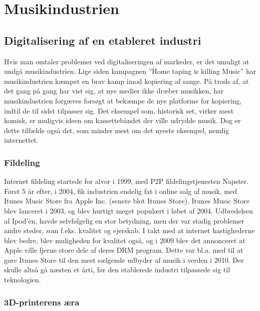 \chapter{Musikindustrien}

\section{Digitalisering af en etableret industri}

Hvis man omtaler problemer ved digitaliseringen af markeder, er det umuligt at undgå musikindustrien. Lige siden kampagnen ”Home taping is killing Music”\cite{Musik1} har musikindustrien kæmpet en brav kamp imod kopiering af sange. På trods af, at det gang på gang har vist sig, at nye medier ikke dræber musikken, har musikindustrien forgæves forsøgt at bekæmpe de nye platforme for kopiering, indtil de til sidst tilpasser sig. Det eksempel som, historisk set, virker mest komisk, er muligvis ideen om kassettebåndet der ville udrydde musik. Dog er dette tilfælde også det, som minder mest om det nyeste eksempel, nemlig internettet.

\subsection{Fildeling}

Internet fildeling startede for alvor i 1999, med P2P\cite{musik2} fildelingstjenesten Napster. Først 5 år efter, i 2004, fik industrien endelig fat i online salg af musik, med Itunes Music Store fra Apple Inc. (senere blot Itunes Store). Itunes Music Store blev lanceret i 2003, og blev hurtigt meget populært i løbet af 2004. Udbredelsen af Ipod’en, havde selvfølgelig en stor betydning, men der var stadig problemer andre steder, som f.eks. kvalitet og ejerskab. I takt med at internet hastighederne blev bedre, blev muligheden for kvalitet også, og i 2009 blev det annonceret at Apple ville fjerne store dele af deres DRM\cite{musik3} program. Dette var bl.a. med til at gøre Itunes Store til den mest sælgende udbyder af musik i verden i 2010.\cite{musik4} Der skulle altså gå næsten et årti, før den etablerede industri tilpassede sig til teknologien. 

\subsection{3D-printerens æra}


